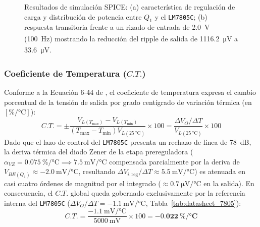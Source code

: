 \begin{figure}[t]
\caption{Resultados de simulación SPICE: (a) característica de regulación de carga y distribución de potencia entre $Q_1$ y el \texttt{LM7805C}; (b) respuesta transitoria frente a un rizado de entrada de \SI{2,0}{\volt_{}} (\SI{100}{\hertz}) mostrando la reducción del ripple de salida de \SI{1116,2}{\micro\volt_{}} a \SI{33,6}{\micro\volt_{}}.}
\label{fig:simulacion_carga_ripple}
\end{figure}

\subsubsection{Coeficiente de Temperatura ($C.T.$)}
Conforme a la Ecuación 6-44 de \cite{gonzalez_p2}, el coeficiente de temperatura expresa el cambio porcentual de la tensión de salida por grado centígrado de variación térmica (en $[\si{\percent\per\celsius}]$):
\begin{equation}
    C.T. = \pm \frac{V_{L(T_{\max})} - V_{L(T_{\min})}}{\left(T_{\max} - T_{\min}\right) V_{L(\SI{25}{\celsius})}} \times 100 = \frac{\Delta V_O / \Delta T}{V_{L(\SI{25}{\celsius})}} \times 100
    \label{eq:ct_def}
\end{equation}
Dado que el lazo de control del \texttt{LM7805C} presenta un rechazo de línea de \SI{78}{\deci\bel}, la deriva térmica del diodo Zener de la etapa prereguladora ($\alpha_{VZ} = \SI{+0,075}{\percent\per\celsius} \implies \SI{+7,5}{\milli\volt\per\celsius}$ compensada parcialmente por la deriva de $V_{BE(Q_1)} \approx \SI{-2,0}{\milli\volt\per\celsius}$, resultando $\Delta V_{i,\text{reg}}/\Delta T \approx \SI{+5,5}{\milli\volt\per\celsius}$) es atenuada en casi cuatro órdenes de magnitud por el integrado ($\approx \SI{+0,7}{\micro\volt\per\celsius}$ en la salida). En consecuencia, el $C.T.$ global queda gobernado exclusivamente por la referencia interna del \texttt{LM7805C} ($\Delta V_O / \Delta T = \SI{-1,1}{\milli\volt\per\celsius}$, Tabla~\ref{tab:datasheet_7805}):
\begin{equation}
    C.T. = \frac{\SI{-1,1}{\milli\volt\per\celsius}}{\SI{5000}{\milli\volt}} \times 100 = \mathbf{\SI{-0,022}{\percent\per\celsius}}
    \label{eq:ct_calc}
\end{equation}

